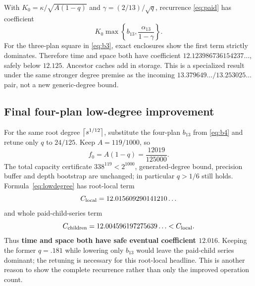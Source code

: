 \documentclass[11pt,letterpaper]{article}
\theoremstyle{remark}\newtheorem{remark}[theorem]{Remark}
\begin{document}
With $K_0=\kappa/\sqrt{A(1-q)}$ and
$\gamma=(2/13)/\sqrt q$, recurrence \eqref{eq:paid} has coefficient
\begin{equation}\label{eq:lowdegree}
 K_0\max\left\{b_{13},\frac{\alpha_{13}}{1-\gamma}\right\}.
\end{equation}
For the three-plan square in \eqref{eq:b3}, exact enclosures show the first term strictly dominates. Therefore time and space both have coefficient
$12.123986736154237\ldots$, safely below $12.125$. Ancestor caches add in storage. This is a specialized result under the same stronger degree premise as the incoming $13.379649\ldots/13.253025\ldots$ pair, not a new generic-degree bound.


\subsection{Final four-plan low-degree improvement}
For the same root degree $\left\lceil s^{1/12}\right\rceil$, substitute the four-plan $b_{13}$ from \eqref{eq:b4} and retune only $q$ to $24/125$. Keep $A=119/1000$, so
\[
 f_0=A(1-q)=\frac{12019}{125000}.
\]
The total capacity certificate $338^{119}<2^{1000}$, generated-degree bound, precision buffer and depth bootstrap are unchanged; in particular $q>1/6$ still holds. Formula~\eqref{eq:lowdegree} has root-local term
\[
 C_{\rm local}=12.015609290141210\ldots
\]
and whole paid-child-series term
\[
 C_{\rm children}=12.004596197275639\ldots<C_{\rm local}.
\]
Thus \textbf{time and space both have safe eventual coefficient $12.016$}. Keeping the former $q=.181$ while lowering only $b_{13}$ would leave the paid-child series dominant; the retuning is necessary for this root-local headline. This is another reason to show the complete recurrence rather than only the improved operation count.
\end{document}
